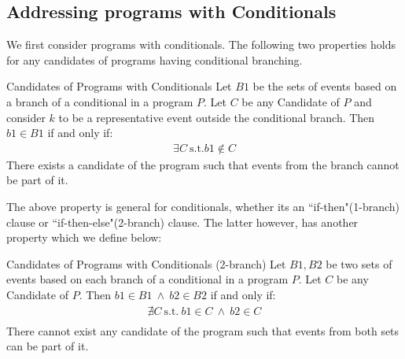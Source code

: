\subsection{Addressing programs with Conditionals}

        We first consider programs with conditionals. 
        The following two properties holds for any candidates of programs having conditional branching. 
        \begin{property}{Candidates of Programs with Conditionals}
            \label{CondB1}
            Let $B1$ be the sets of events based on a branch of a conditional in a program $P$. 
            Let $C$ be any Candidate of $P$ and consider $k$ to be a representative event outside the conditional branch. 
            Then $b1 \in B1$ if and only if:
            \begin{align*}
                \exists C \ \text{s.t.} b1 \notin C  
            \end{align*}
            There exists a candidate of the program such that events from the branch cannot be part of it\footnotemark. 
        \end{property}

        The above property is general for conditionals, whether its an ``if-then"(1-branch) clause or ``if-then-else"(2-branch) clause. 
        The latter however, has another property which we define below:
        \begin{property}{Candidates of Programs with Conditionals (2-branch)}
            \label{CondB2}
            Let $B1,B2$ be two sets of events based on each branch of a conditional in a program $P$. 
            Let $C$ be any Candidate of $P$. 
            Then $b1 \in B1 \ \wedge \ b2 \in B2$ if and only if:
            \begin{align*}
                \nexists C \ \text{s.t.} \ b1 \in C \ \wedge \ b2 \in C \\ 
            \end{align*}
            There cannot exist any candidate of the program such that events from both sets can be part of it\footnotemark. 
        \end{property}


